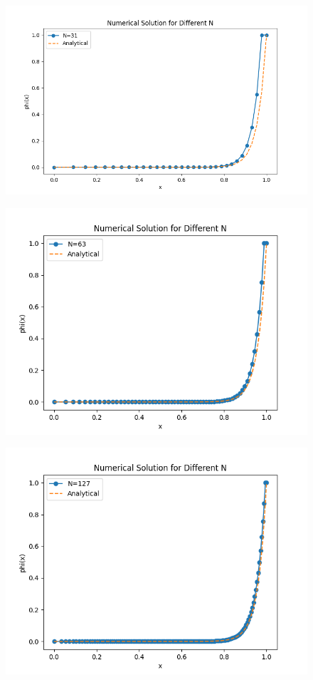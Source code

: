 \documentclass{article}
\begin{document}
\begin{figure}[h!]
  \centering
  \begin{minipage}{0.32\textwidth}
      \centering
      \includegraphics[width=\textwidth]{FDM_32.png}
      \label{fig:32}
  \end{minipage} \hfill
  \begin{minipage}{0.32\textwidth}
      \centering
      \includegraphics[width=\textwidth]{FDM_64.png}
      \label{fig:64}
  \end{minipage} \hfill
  \begin{minipage}{0.32\textwidth}
      \centering
      \includegraphics[width=\textwidth]{FDM_128.png}

\end{minipage}
\end{figure}
\end{document}
